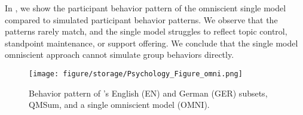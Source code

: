 In , we show the participant behavior pattern of the omniscient single model compared to \dataset{} simulated participant behavior patterns.
We observe that the patterns rarely match, and the single model struggles to reflect topic control, standpoint maintenance, or support offering.
We conclude that the single model omniscient approach cannot simulate group behaviors directly.


\begin{figure}[ht!]
    \centering
    \texttt{[image: figure/storage/Psychology\_Figure\_omni.png]}
    \caption{Behavior pattern of \dataset{}'s English (EN) and German (GER) subsets, QMSum, and a single omniscient model (OMNI).}
    \label{fig:app_omni_psychology}
\end{figure}
